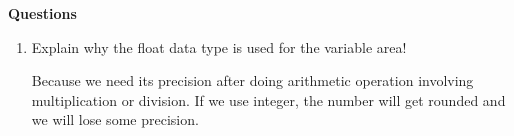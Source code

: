 \documentclass[12pt,titlepage]{article}
\begin{document}
\pagebreak
\textbf{Questions}
\begin{enumerate}
    \item {
        Explain why the float data type is used for the variable area!

        Because we need its precision after doing arithmetic operation involving multiplication or division.
        If we use integer, the number will get rounded and we will lose some precision.
    }
\end{enumerate}
\end{document}
